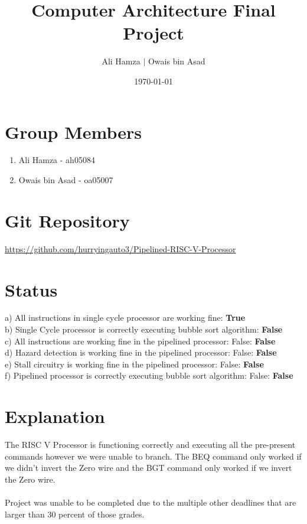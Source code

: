 \documentclass{article}
\title{Computer Architecture Final Project}
\author{Ali Hamza $|$ Owais bin Asad}
\date{\today}
\begin{document}
    \maketitle
    \section*{Group Members}
    \begin{enumerate}
        \item Ali Hamza - ah05084
        \item Owais bin Asad - oa05007
    \end{enumerate}
    \section{Git Repository}
    \url{https://github.com/hurryingauto3/Pipelined-RISC-V-Processor}
    \section{Status}

            a) All instructions in single cycle processor are working fine: \textbf{True}\\
            b) Single Cycle processor is correctly executing bubble sort algorithm: \textbf{False}\\
            c) All instructions are working fine in the pipelined processor: False: \textbf{False}\\
            d) Hazard detection is working fine in the pipelined processor: False: \textbf{False}\\
            e) Stall circuitry is working fine in the pipelined processor: False: \textbf{False}\\
            f) Pipelined processor is correctly executing bubble sort algorithm: False: \textbf{False}\\

    \section{Explanation}

    The RISC V Processor is functioning correctly and executing all the pre-present commands however
    we were unable to branch. The BEQ command only worked if we didn't invert the Zero wire and the BGT command 
    only worked if we invert the Zero wire. \\\\ Project was unable to be completed due to the multiple other deadlines that are larger than 30 percent of those
    grades. 
        
    
\end{document}
